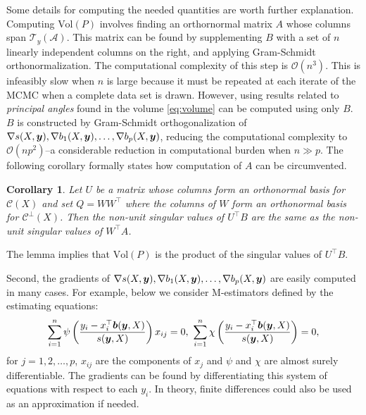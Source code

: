 \documentclass[ba]{imsart}
\newcommand{\by}{\mbox{\boldmath $y$}}
\newcommand{\bb}{\mbox{\boldmath $b$}}
\newcommand{\mc}{\mathcal}
\newtheorem{corollary}[theorem]{\bf Corollary}
\begin{document}
Some details for computing the needed quantities are worth further explanation. Computing $\text{Vol} (P)$ involves finding an orthornormal matrix $A$ whose columns span $\mc T_{y}(\mc A)$. This matrix can be found by supplementing $B$ with a set of $n$ linearly independent columns on the right, and applying Gram-Schmidt orthonormalization.  The computational complexity of this step is $\mc O(n^3)$.  This is infeasibly slow when $n$ is large because it must be repeated at each iterate of the MCMC when a complete data set is drawn.  However, using results related to \textit{principal angles} found in \cite{miao1992} the volume \eqref{eq:volume} can be computed using only $B$. $B$ is constructed by Gram-Schmidt orthogonalization of $\nabla s(X,\by), \nabla b_1(X,\by),\dots, \nabla b_p(X,\by)$, reducing the computational complexity to $\mc O(np^2)$--a 
considerable reduction in computational burden when $n \gg p$. 
The following corollary formally states how computation of $A$ can be circumvented. 
\begin{corollary}
\label{theorem:sings}
Let $U$ be a matrix whose columns form an orthonormal basis for $\mc C (X)$ and set $Q=WW^{\top}$ where the columns of $W$ form an orthonormal basis for $\mc{C}^\perp(X)$. Then the non-unit singular values of $U^\top B$ are the same as the non-unit singular values of $W^\top A$.
\end{corollary} 
\noindent The lemma implies that $\text{Vol} (P)$ is the product of the singular values of $U^\top B$. 

Second, the gradients of $\nabla s(X,\by), \nabla b_1(X,\by),\dots, \nabla b_p(X,\by)$ are easily computed in many cases. For example, below we consider M-estimators defined by the estimating equations:
\begin{eqnarray}
\label{Mest}
 \sum_{i=1}^n \psi\left(\frac{y_i - x_{i}^{\top}\bb(\by,X)}{s(\by,X)}\right) x_{ij}=0, \
 \sum_{i=1}^n \chi\left(\frac{y_i - x_{i}^{\top}\bb(\by,X)}{s(\by,X)}\right)=0, 
 \end{eqnarray} 
for $j = 1, 2, \dots, p$, $x_{ij}$ are the components of $x_{j}$ and  $\psi$ and $\chi$ are almost surely differentiable. The gradients can be found by differentiating this system of equations with respect to each $y_{i}$. In theory, finite differences could also be used as an approximation if needed. 
\end{document}
